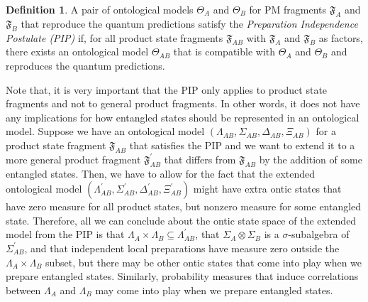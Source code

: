 \documentclass[DIV=calc,fontsize=12pt]{scrartcl} %
\theoremstyle{definition}
\newtheorem{definition}{Definition}[section]
\theoremstyle{plain}
\begin{document}
\begin{definition}
A pair of ontological models $\Theta_A$ and $\Theta_B$ for PM
fragments $\mathfrak{F}_A$ and $\mathfrak{F}_B$ that reproduce the
quantum predictions satisfy the \emph{Preparation Independence
Postulate (PIP)} if, for all product state fragments
$\mathfrak{F}_{AB}$ with $\mathfrak{F}_A$ and $\mathfrak{F}_B$ as
factors, there exists an ontological model $\Theta_{AB}$ that is
compatible with $\Theta_A$ and $\Theta_B$ and reproduces the quantum
predictions.
\end{definition}

Note that, it is very important that the PIP only applies to product
state fragments and not to general product fragments.  In other words,
it does not have any implications for how entangled states should be
represented in an ontological model.  Suppose we have an ontological
model $(\Lambda_{AB}, \Sigma_{AB}, \Delta_{AB}, \Xi_{AB})$ for a
product state fragment $\mathfrak{F}_{AB}$ that satisfies the PIP and
we want to extend it to a more general product fragment
$\mathfrak{F}^{\prime}_{AB}$ that differs from $\mathfrak{F}_{AB}$ by
the addition of some entangled states.  Then, we have to allow for the
fact that the extended ontological model $(\Lambda^{\prime}_{AB},
\Sigma^{\prime}_{AB}, \Delta^{\prime}_{AB}, \Xi^{\prime}_{AB})$ might
have extra ontic states that have zero measure for all product states,
but nonzero measure for some entangled state.  Therefore, all we can
conclude about the ontic state space of the extended model from the
PIP is that $\Lambda_A \times \Lambda_B \subseteq
\Lambda^{\prime}_{AB}$, that $\Sigma_A \otimes \Sigma_B$ is a
$\sigma$-subalgebra of $\Sigma^{\prime}_{AB}$, and that independent
local preparations have measure zero outside the $\Lambda_A \times
\Lambda_B$ subset, but there may be other ontic states that come into
play when we prepare entangled states.  Similarly, probability
measures that induce correlations between $\Lambda_A$ and $\Lambda_B$
may come into play when we prepare entangled states.
\end{document}
